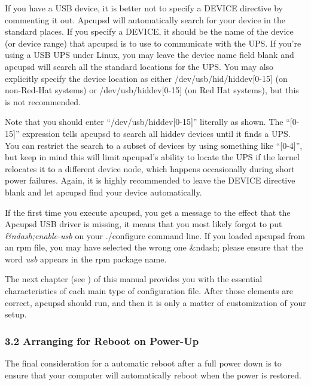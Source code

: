 If you have a USB device, it is better not to specify a DEVICE directive by
commenting it out. Apcupsd will automatically search for your device in the
standard places. If you specify a DEVICE, it should be the name of the device
(or device range) that apcupsd is to use to communicate with the UPS.  If
you're using a USB UPS under Linux, you may leave the device name field blank
and apcupsd will search all the standard locations for the UPS. You may also
explicitly specify the device location as either /dev/usb/hid/hiddev[0-15] (on
non-Red-Hat systems) or /dev/usb/hiddev[0-15] (on Red Hat systems), but this
is not recommended.  

Note that you should enter ``/dev/usb/hiddev[0-15]'' literally as shown.  The
``[0-15]'' expression tells apcupsd to search all hiddev devices until it
finds a UPS. You can restrict the search to a subset of devices by using
something like ``[0-4]'', but keep in mind this will limit apcupsd's ability
to locate the UPS if the kernel relocates it to a different device node, which
happens occasionally during short power failures. Again, it is highly
recommended to leave the DEVICE directive blank and let apcupsd find your
device automatically.  

If the first time you execute apcupsd, you get a message to the effect that
the Apcupsd USB driver is missing, it means that you most likely forgot to put
{\it \&ndash;enable-usb} on your ./configure command line. If you loaded
apcupsd from an rpm file, you may have selected the wrong one \&ndash; please
ensure that the word {\it usb} appears in the rpm package name.  

The next chapter (see 
) of this
manual provides you with the essential characteristics of each main type of
configuration file.  After those elements are correct, apcupsd should run, and
then it is only a matter of customization of your setup. 

\label{Arranging-for-Reboot-on-Power_002dUp}

\subsubsection*{3.2 Arranging for Reboot on Power-Up}

\label{index-Reboot-on-power-up-60}
\label{index-Power-up_002c-reboot-61}
The final consideration for a automatic reboot after a full power down is to
ensure that your computer will automatically reboot when the power is
restored.  

